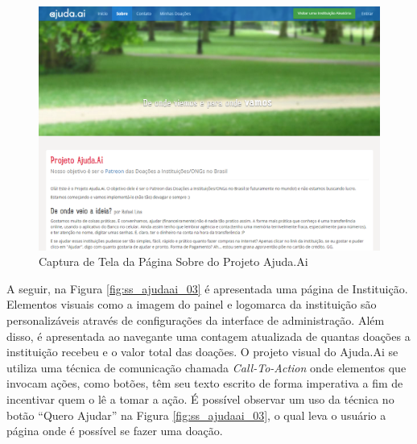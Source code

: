 \begin{figure}[H]
	\caption{\label{fig:ss_ajudaai_02}Captura de Tela da Página Sobre do Projeto Ajuda.Ai}
    \centering
    \includegraphics[scale=0.45]{imagens/screenshot-ajudaai-02.png}
\end{figure}

A seguir, na Figura \ref{fig:ss_ajudaai_03} é apresentada uma página de Instituição. Elementos visuais como a imagem do painel e logomarca da instituição são personalizáveis através de configurações da interface de administração. Além disso, é apresentada ao navegante uma contagem atualizada de quantas doações a instituição recebeu e o valor total das doações. O projeto visual do Ajuda.Ai se utiliza uma técnica de comunicação chamada \emph{Call-To-Action} onde elementos que invocam ações, como botões, têm seu texto escrito de forma imperativa a fim de incentivar quem o lê a tomar a ação. É possível observar um uso da técnica no botão ``Quero Ajudar'' na Figura \ref{fig:ss_ajudaai_03}, o qual leva o usuário a página onde é possível se fazer uma doação.

